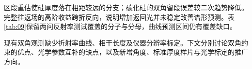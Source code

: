 区段重估使硅厚度落在相距较远的分支；碳化硅的双角留段误差较二次趋势降低。完整往返场的高阶收益跨折反向，说明增加返回光并未稳定改善谱形预测。表\ref{tab:09}保留两问反射率测试覆盖的分子与分母，曲线预测区间仍有覆盖缺口。

现有双角观测缺少折射率曲线、相干长度及仪器分辨率标定。下文分别讨论双角约束的优点、光学参数互补的缺点，以及新增角度、标准厚度样片与光学标定的推广方向。
